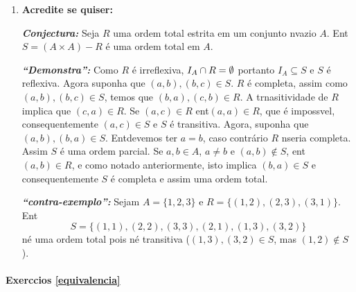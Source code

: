 \begin{enumerate}[{\bf 1.}]
\item {\bf Acredite se quiser:}  

\noindent \textit{\textbf{Conjectura:}} Seja $R$ uma ordem total estrita em um conjunto n\ao vazio $A$. Ent\ao $S=(A\times A)-R$ \'e uma ordem total em $A$. 

\noindent \textit{\textbf{``Demonstra\caoi'':}} Como $R$ \'e irreflexiva, $I_A\cap R=\emptyset$ portanto $I_A\subseteq S$ e $S$ \'e reflexiva. Agora suponha que $(a,b),(b,c)\in S$. $R$ \'e completa, assim como $(a,b),(b,c)\in S$, temos que $(b,a),(c,b)\in R$. A trnasitividade de $R$ implica que $(c,a)\in R$. Se $(a,c)\in R$ ent\ao $(a,a)\in R$, que \'e imposs\ih vel, consequentemente $(a,c)\in S$ e $S$ \'e transitiva. Agora, suponha que $(a,b),(b,a)\in S$. Ent\ao devemos ter $a=b$, caso contr\'ario $R$ n\ao seria completa. Assim $S$ \'e uma ordem parcial. Se $a,b\in A$, $a\neq b$ e $(a,b)\notin S$, ent\ao $(a,b)\in R$, e como notado anteriormente, isto implica $(b,a)\in S$ e consequentemente $S$ \'e completa e assim uma ordem total.

\noindent \textit{\textbf{``contra-exemplo'':}} Sejam $A=\{1,2,3\}$ e $R=\{(1,2),(2,3),(3,1)\}$. Ent\ao
\[
S=\{(1,1),(2,2),(3,3),(2,1),(1,3),(3,2)\}
\]
n\ao \'e uma ordem total pois n\ao \'e transitiva ($(1,3),(3,2)\in S$, mas $(1,2)\notin S$).
\end{enumerate}
\paragraph{Exerc\ih cios \ref{equivalencia}}

